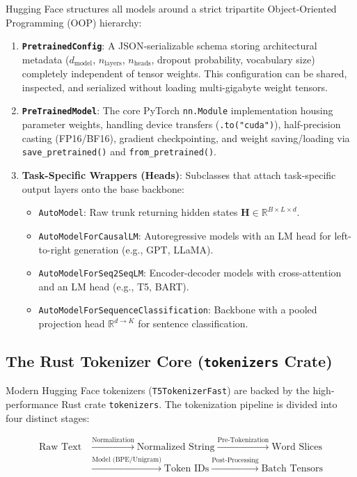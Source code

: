 \documentclass[11pt,a4paper]{article}
\begin{document}
Hugging Face structures all models around a strict tripartite Object-Oriented Programming (OOP) hierarchy:
\begin{enumerate}
    \item \textbf{\texttt{PretrainedConfig}}: A JSON-serializable schema storing architectural metadata ($d_{\text{model}}$, $n_{\text{layers}}$, $n_{\text{heads}}$, dropout probability, vocabulary size) completely independent of tensor weights. This configuration can be shared, inspected, and serialized without loading multi-gigabyte weight tensors.
    \item \textbf{\texttt{PreTrainedModel}}: The core PyTorch \texttt{nn.Module} implementation housing parameter weights, handling device transfers (\texttt{.to("cuda")}), half-precision casting (FP16/BF16), gradient checkpointing, and weight saving/loading via \texttt{save\_pretrained()} and \texttt{from\_pretrained()}.
    \item \textbf{Task-Specific Wrappers (Heads)}: Subclasses that attach task-specific output layers onto the base backbone:
    \begin{itemize}
        \item \texttt{AutoModel}: Raw trunk returning hidden states $\mathbf{H} \in \mathbb{R}^{B \times L \times d}$.
        \item \texttt{AutoModelForCausalLM}: Autoregressive models with an LM head for left-to-right generation (e.g., GPT, LLaMA).
        \item \texttt{AutoModelForSeq2SeqLM}: Encoder-decoder models with cross-attention and an LM head (e.g., T5, BART).
        \item \texttt{AutoModelForSequenceClassification}: Backbone with a pooled projection head $\mathbb{R}^{d \to K}$ for sentence classification.
    \end{itemize}
\end{enumerate}

\subsection{The Rust Tokenizer Core (\texttt{tokenizers} Crate)}

Modern Hugging Face tokenizers (\texttt{T5TokenizerFast}) are backed by the high-performance Rust crate \texttt{tokenizers}. The tokenization pipeline is divided into four distinct stages:

\begin{equation}
\begin{aligned}
\text{Raw Text} &\xrightarrow{\text{Normalization}} \text{Normalized String} \xrightarrow{\text{Pre-Tokenization}} \text{Word Slices} \\
&\xrightarrow{\text{Model (BPE/Unigram)}} \text{Token IDs} \xrightarrow{\text{Post-Processing}} \text{Batch Tensors}
\end{aligned}
\end{equation}
\end{document}
